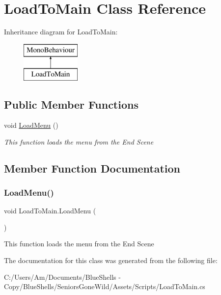 \hypertarget{class_load_to_main}{}\section{Load\+To\+Main Class Reference}
\label{class_load_to_main}
Inheritance diagram for Load\+To\+Main\+:\begin{figure}[H]
\begin{center}
\leavevmode
\includegraphics[height=2.000000cm]{class_load_to_main}
\end{center}
\end{figure}
\subsection*{Public Member Functions}
\begin{DoxyCompactItemize}
\item 
void \mbox{\hyperlink{class_load_to_main_a07eacdc3214c521d41e4ee14f9234a50}{Load\+Menu}} ()
\begin{DoxyCompactList}\small\item\em This function loads the menu from the End Scene \end{DoxyCompactList}\end{DoxyCompactItemize}


\subsection{Member Function Documentation}
\mbox{\label{class_load_to_main_a07eacdc3214c521d41e4ee14f9234a50}} 
\subsubsection{\texorpdfstring{Load\+Menu()}{LoadMenu()}}
{\footnotesize\ttfamily void Load\+To\+Main.\+Load\+Menu (\begin{DoxyParamCaption}{ }\end{DoxyParamCaption})}



This function loads the menu from the End Scene 



The documentation for this class was generated from the following file\+:\begin{DoxyCompactItemize}
\item 
C\+:/\+Users/\+Am/\+Documents/\+Blue\+Shells -\/ Copy/\+Blue\+Shells/\+Seniors\+Gone\+Wild/\+Assets/\+Scripts/Load\+To\+Main.\+cs\end{DoxyCompactItemize}

